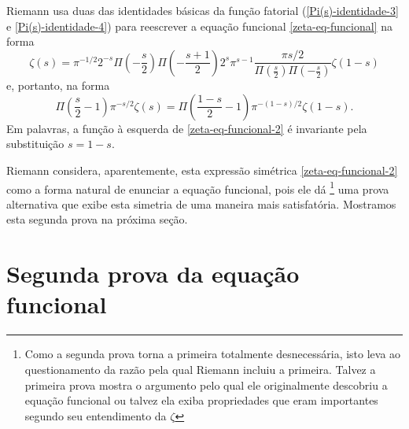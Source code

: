     Riemann usa duas das identidades básicas da função fatorial (\eqref{Pi(s)-identidade-3} e \eqref{Pi(s)-identidade-4}) para reescrever a equação funcional \eqref{zeta-eq-funcional} na forma
    \begin{equation*}
        \zeta(s) = \pi^{-1/2} 2^{-s} \Pi\left( -\frac{s}{2} \right) \Pi\left( -\frac{s+1}{2} \right) 2^{s} \pi^{s-1} \frac{\pi s / 2}{\Pi\left( \frac{s}{2} \right)\Pi\left( -\frac{s}{2} \right)} \zeta(1-s)
    \end{equation*}
    e, portanto, na forma
    \begin{equation}
        \label{zeta-eq-funcional-2}
        \Pi\left( \frac{s}{2} - 1 \right) \pi^{-s/2} \zeta(s) = \Pi\left( \frac{1 - s}{2} - 1 \right) \pi^{-(1 - s)/2} \zeta(1-s).
    \end{equation}
    Em palavras, a função à esquerda de \eqref{zeta-eq-funcional-2} é invariante pela substituição $s = 1-s$.
    
    Riemann considera, aparentemente, esta expressão simétrica \eqref{zeta-eq-funcional-2} como a forma natural de enunciar a equação funcional, pois ele dá 
    \footnote{Como a segunda prova torna a primeira totalmente desnecessária, isto leva ao questionamento da razão pela qual Riemann incluiu a primeira. Talvez a primeira prova mostra o argumento pelo qual ele originalmente descobriu a equação funcional ou talvez ela exiba propriedades que eram importantes segundo seu entendimento da $\zeta$
    }
    uma prova alternativa que exibe esta simetria de uma maneira mais satisfatória. Mostramos esta segunda prova na próxima seção. 
    
    \section{Segunda prova da equação funcional}
    
